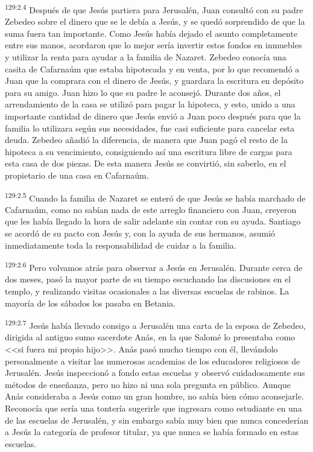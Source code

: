 \par 
\textsuperscript{129:2.4} Después de que Jesús partiera para Jerusalén, Juan consultó con su padre Zebedeo sobre el dinero que se le debía a Jesús, y se quedó sorprendido de que la suma fuera tan importante. Como Jesús había dejado el asunto completamente entre sus manos, acordaron que lo mejor sería invertir estos fondos en inmuebles y utilizar la renta para ayudar a la familia de Nazaret. Zebedeo conocía una casita de Cafarnaúm que estaba hipotecada y en venta, por lo que recomendó a Juan que la comprara con el dinero de Jesús, y guardara la escritura en depósito para su amigo. Juan hizo lo que su padre le aconsejó. Durante dos años, el arrendamiento de la casa se utilizó para pagar la hipoteca, y esto, unido a una importante cantidad de dinero que Jesús envió a Juan poco después para que la familia lo utilizara según sus necesidades, fue casi suficiente para cancelar esta deuda. Zebedeo añadió la diferencia, de manera que Juan pagó el resto de la hipoteca a su vencimiento, consiguiendo así una escritura libre de cargas para esta casa de dos piezas. De esta manera Jesús se convirtió, sin saberlo, en el propietario de una casa en Cafarnaúm.

\par 
\textsuperscript{129:2.5} Cuando la familia de Nazaret se enteró de que Jesús se había marchado de Cafarnaúm, como no sabían nada de este arreglo financiero con Juan, creyeron que les había llegado la hora de salir adelante sin contar con su ayuda. Santiago se acordó de su pacto con Jesús y, con la ayuda de sus hermanos, asumió inmediatamente toda la responsabilidad de cuidar a la familia.

\par 
\textsuperscript{129:2.6} Pero volvamos atrás para observar a Jesús en Jerusalén. Durante cerca de dos meses, pasó la mayor parte de su tiempo escuchando las discusiones en el templo, y realizando visitas ocasionales a las diversas escuelas de rabinos. La mayoría de los sábados los pasaba en Betania.

\par 
\textsuperscript{129:2.7} Jesús había llevado consigo a Jerusalén una carta de la esposa de Zebedeo, dirigida al antiguo sumo sacerdote Anás, en la que Salomé lo presentaba como <<si fuera mi propio hijo>>. Anás pasó mucho tiempo con él, llevándolo personalmente a visitar las numerosas academias de los educadores religiosos de Jerusalén. Jesús inspeccionó a fondo estas escuelas y observó cuidadosamente sus métodos de enseñanza, pero no hizo ni una sola pregunta en público. Aunque Anás consideraba a Jesús como un gran hombre, no sabía bien cómo aconsejarle. Reconocía que sería una tontería sugerirle que ingresara como estudiante en una de las escuelas de Jerusalén, y sin embargo sabía muy bien que nunca concederían a Jesús la categoría de profesor titular, ya que nunca se había formado en estas escuelas.

